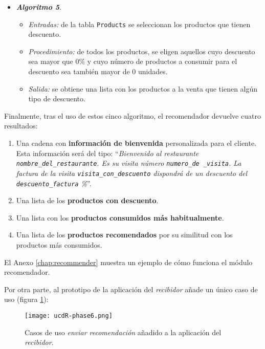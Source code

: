 \begin{itemize}
\item \textbf{\emph{Algoritmo 5}}.
  \begin{itemize}
  \item \emph{Entradas:} de la tabla \texttt{Products} se seleccionan los
  productos que tienen descuento.
  \item \emph{Procedimiento:} de todos los productos, se eligen aquellos cuyo
  descuento sea mayor que 0\% y cuyo número de productos a consumir para el
  descuento sea también mayor de 0 unidades.
  \item \emph{Salida:} se obtiene una lista con los productos a la venta que
  tienen algún tipo de descuento.
  \end{itemize}
\end{itemize}

Finalmente, tras el uso de estos cinco algoritmo, el recomendador devuelve 
cuatro resultados:
\begin{enumerate}
\item Una cadena con \textbf{información de bienvenida} personalizada para
el cliente. Esta información será del tipo: ``\emph{Bienvenido al restaurante
\texttt{nombre\_del\_restaurante}. Es su visita número \texttt{numero\_de
\_visita}. La factura de la visita \texttt{visita\_con\_descuento} dispondrá 
de un descuento del \texttt{descuento\_factura} \%}''.
\item Una lista de los \textbf{productos con descuento}.
\item Una lista con los \textbf{productos consumidos más habitualmente}.
\item Una lista de los \textbf{productos recomendados} por su similitud con
los productos más consumidos.
\end{enumerate}

El Anexo \ref{chap:recommender} muestra un ejemplo de cómo funciona el
módulo recomendador.

Por otra parte, al prototipo de la aplicación del \emph{recibidor} añade un 
único caso de uso (figura \ref{fig:ucdR-phase6}):

  \begin{figure}[H]
    \begin{center}
      \texttt{[image: ucdR-phase6.png]}
      \caption{Casos de uso \emph{enviar recomendación} añadido a la aplicación 
      del \emph{recibidor}.}
      \label{fig:ucdR-phase6}
    \end{center}
  \end{figure}

